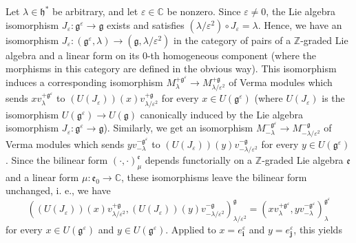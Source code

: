 \documentclass[etingof-lie.tex]{subfiles}
\begin{document}
Let $\lambda\in\mathfrak{h}^{\ast}$ be arbitrary, and let $\varepsilon
\in\mathbb{C}$ be nonzero. Since $\varepsilon\neq0$, the Lie algebra
isomorphism $J_{\varepsilon}:\mathfrak{g}^{\varepsilon}\rightarrow
\mathfrak{g}$ exists and satisfies $\left(  \lambda/\varepsilon^{2}\right)
\circ J_{\varepsilon}=\lambda$. Hence, we have an isomorphism $J_{\varepsilon
}:\left(  \mathfrak{g}^{\varepsilon},\lambda\right)  \rightarrow\left(
\mathfrak{g},\lambda/\varepsilon^{2}\right)  $ in the category of pairs of a
$\mathbb{Z}$-graded Lie algebra and a linear form on its $0$-th homogeneous
component (where the morphisms in this category are defined in the obvious
way). This isomorphism induces a corresponding isomorphism $M_{\lambda
}^{+\mathfrak{g}^{\varepsilon}}\rightarrow M_{\lambda/\varepsilon^{2}%
}^{+\mathfrak{g}}$ of Verma modules which sends $xv_{\lambda}^{+\mathfrak{g}%
^{\varepsilon}}$ to $\left(  U\left(  J_{\varepsilon}\right)  \right)  \left(
x\right)  v_{\lambda/\varepsilon^{2}}^{+\mathfrak{g}}$ for every $x\in
U\left(  \mathfrak{g}^{\varepsilon}\right)  $ (where $U\left(  J_{\varepsilon
}\right)  $ is the isomorphism $U\left(  \mathfrak{g}^{\varepsilon}\right)
\rightarrow U\left(  \mathfrak{g}\right)  $ canonically induced by the Lie
algebra isomorphism $J_{\varepsilon}:\mathfrak{g}^{\varepsilon}\rightarrow
\mathfrak{g}$). Similarly, we get an isomorphism $M_{-\lambda}^{-\mathfrak{g}%
^{\varepsilon}}\rightarrow M_{-\lambda/\varepsilon^{2}}^{-\mathfrak{g}}$ of
Verma modules which sends $yv_{-\lambda}^{-\mathfrak{g}^{\varepsilon}}$ to
$\left(  U\left(  J_{\varepsilon}\right)  \right)  \left(  y\right)
v_{-\lambda/\varepsilon^{2}}^{-\mathfrak{g}}$ for every $y\in U\left(
\mathfrak{g}^{\varepsilon}\right)  $. Since the bilinear form $\left(
\cdot,\cdot\right)  _{\mu}^{\mathfrak{e}}$ depends functorially on a
$\mathbb{Z}$-graded Lie algebra $\mathfrak{e}$ and a linear form
$\mu:\mathfrak{e}_{0}\rightarrow\mathbb{C}$, these isomorphisms leave the
bilinear form unchanged, i. e., we have%
\[
\left(  \left(  U\left(  J_{\varepsilon}\right)  \right)  \left(  x\right)
v_{\lambda/\varepsilon^{2}}^{+\mathfrak{g}},\left(  U\left(  J_{\varepsilon
}\right)  \right)  \left(  y\right)  v_{-\lambda/\varepsilon^{2}%
}^{-\mathfrak{g}}\right)  _{\lambda/\varepsilon^{2}}^{\mathfrak{g}}=\left(
xv_{\lambda}^{+\mathfrak{g}^{\varepsilon}},yv_{-\lambda}^{-\mathfrak{g}%
^{\varepsilon}}\right)  _{\lambda}^{\mathfrak{g}^{\varepsilon}}%
\]
for every $x\in U\left(  \mathfrak{g}^{\varepsilon}\right)  $ and $y\in
U\left(  \mathfrak{g}^{\varepsilon}\right)  $. Applied to $x=e_{\mathbf{i}%
}^{\varepsilon}$ and $y=e_{\mathbf{j}}^{\varepsilon}$, this yields%
\end{document}
